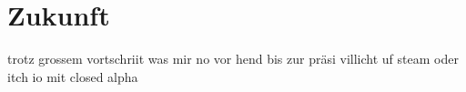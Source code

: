 \chapter{Zukunft}

trotz grossem vortschriit
was mir no vor hend bis zur präsi
villicht uf steam oder itch io
mit closed alpha